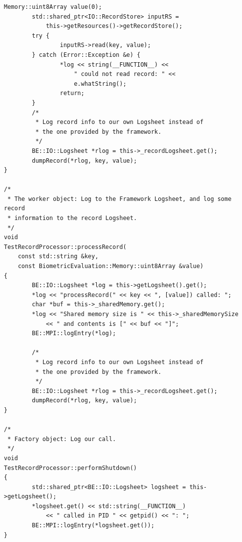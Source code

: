 \begin{lstlisting}[caption={MPI Framework Application Implementation}, label=lst:mpiappimpl]
        Memory::uint8Array value(0);
        std::shared_ptr<IO::RecordStore> inputRS =
            this->getResources()->getRecordStore();
        try {
                inputRS->read(key, value);
        } catch (Error::Exception &e) {
                *log << string(__FUNCTION__) <<
                    " could not read record: " <<
                    e.whatString();
                return; 
        }
        /*
         * Log record info to our own Logsheet instead of
         * the one provided by the framework.
         */     
        BE::IO::Logsheet *rlog = this->_recordLogsheet.get();
        dumpRecord(*rlog, key, value);
}

/*
 * The worker object: Log to the Framework Logsheet, and log some record
 * information to the record Logsheet.
 */
void
TestRecordProcessor::processRecord(
    const std::string &key,
    const BiometricEvaluation::Memory::uint8Array &value)
{
        BE::IO::Logsheet *log = this->getLogsheet().get();
        *log << "processRecord(" << key << ", [value]) called: ";
        char *buf = this->_sharedMemory.get();
        *log << "Shared memory size is " << this->_sharedMemorySize
            << " and contents is [" << buf << "]";
        BE::MPI::logEntry(*log);

        /*
         * Log record info to our own Logsheet instead of
         * the one provided by the framework.
         */
        BE::IO::Logsheet *rlog = this->_recordLogsheet.get();
        dumpRecord(*rlog, key, value);
}

/*
 * Factory object: Log our call.
 */
void
TestRecordProcessor::performShutdown()
{
        std::shared_ptr<BE::IO::Logsheet> logsheet = this->getLogsheet();
        *logsheet.get() << std::string(__FUNCTION__)
            << " called in PID " << getpid() << ": ";
        BE::MPI::logEntry(*logsheet.get());
}

\end{lstlisting}

